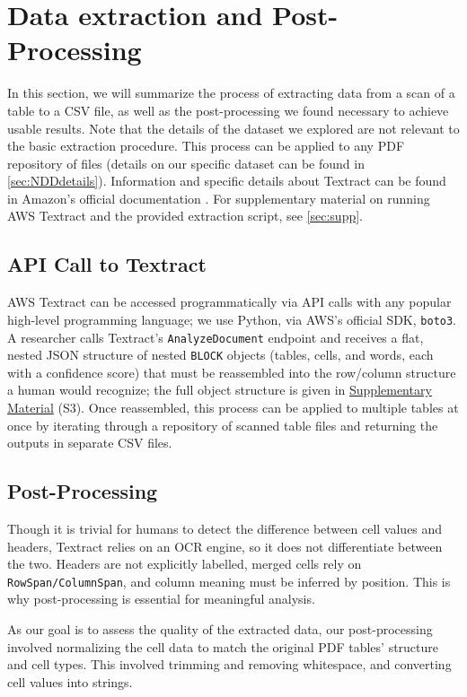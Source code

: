 \documentclass[12pt]{article}
\begin{document}
\section{Data extraction and Post-Processing} \label{sec:data-extraction}

In this section, we will summarize the process of extracting data from a scan of a table to a CSV file, as well as the post-processing we found necessary to achieve usable results. Note that the details of the dataset we explored are not relevant to the basic extraction procedure. This process can be applied to any PDF repository of files (details on our specific dataset can be found in \cref{sec:NDDdetails}). Information and specific details about Textract can be found in Amazon's official documentation \cite{awsdocumentation}. 
For supplementary material on running AWS Textract and the provided extraction script, see \cref{sec:supp}.

\subsection{API Call to Textract}
AWS Textract can be accessed programmatically via API calls with any popular high-level programming language; we use Python, via AWS's official SDK, \texttt{boto3}. A researcher calls Textract's \texttt{AnalyzeDocument} endpoint and receives a flat, nested JSON structure of nested \texttt{BLOCK} objects (tables, cells, and words, each with a confidence score) that must be reassembled into the row/column structure a human would recognize; the full object structure is given in \hyperref[sec:supp]{Supplementary Material} (S3). Once reassembled, this process can be applied to multiple tables at once by iterating through a repository of scanned table files and returning the outputs in separate CSV files.

\subsection{Post-Processing}\label{sec:postprocessing}
Though it is trivial for humans to detect the difference between cell values and headers, Textract relies on an OCR engine, so it does not differentiate between the two. Headers are not explicitly labelled, merged cells rely on \texttt{RowSpan/ColumnSpan}, and column meaning must be inferred by position. This is why post-processing is essential for meaningful analysis.

As our goal is to assess the quality of the extracted data, our post-processing involved normalizing the cell data to match the original PDF tables' structure and cell types. This involved trimming and removing whitespace, and converting cell values into strings.
\end{document}

